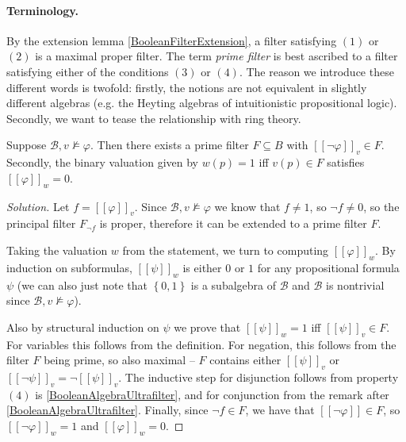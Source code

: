 \paragraph{Terminology.} By the extension lemma \ref{BooleanFilterExtension}, a filter satisfying \( (1) \) or   \( (2) \) is a maximal proper filter. The term \emph{prime filter} is best ascribed to a filter satisfying either of the conditions \( (3) \) or \( (4) \). The reason we introduce these different words is twofold: firstly, the notions are not equivalent in slightly different algebras (e.g. the Heyting algebras of intuitionistic propositional logic). Secondly, we want to tease the relationship with ring theory.

\begin{problem}
    Suppose \( \mathcal{B}, v \not\models \varphi \). Then there exists a prime filter \( F \subseteq B \) with \( \left[ \left[ \neg\varphi \right] \right]_v \in F\). Secondly, the binary valuation given by \( w(p) = 1 \) iff \( v(p) \in F \) satisfies \( \left[ \left[ \varphi \right] \right]_w = 0 \).
\end{problem}

\begin{proof}[Solution]
    Let \( f = \left[ \left[ \varphi \right] \right]_v \). Since \( \mathcal{B}, v \not\models \varphi \) we know that \( f \neq 1 \), so \( \neg f \neq 0 \), so the principal filter \( F_{\neg f} \) is proper, therefore it can be extended to a prime filter \( F \). %

    Taking the valuation \( w \) from the statement, we turn to computing \( \left[ \left[ \varphi \right] \right]_w \). By induction on subformulas, \( \left[ \left[ \psi \right] \right]_w \) is either \( 0 \) or \( 1 \) for any propositional formula \( \psi \) (we can also just note that \( \left\{ 0,1 \right\} \) is a subalgebra of \( \mathcal{B} \) and \( \mathcal{B} \) is nontrivial since \( \mathcal{B}, v \not\models \varphi \)).
    
    Also by structural induction on \( \psi \) we prove that \( \left[ \left[ \psi \right] \right]_w = 1 \) iff \( \left[ \left[ \psi \right] \right]_v \in F \). For variables this follows from the definition. For negation, this follows from the filter \( F \) being prime, so also maximal -- \( F \) contains either \( \left[ \left[ \psi \right] \right]_v \) or \( \left[ \left[ \neg\psi \right] \right]_v = \neg \left[ \left[ \psi \right] \right]_v \). The inductive step for disjunction follows from property \( (4) \) is \ref{BooleanAlgebraUltrafilter}, and for conjunction from the remark after \ref{BooleanAlgebraUltrafilter}.
    Finally, since \( \neg f \in F \), we have that \( \left[ \left[ \neg\varphi \right] \right] \in F \), so \( \left[ \left[ \neg\varphi \right] \right]_w = 1 \) and \( \left[ \left[ \varphi \right] \right]_w = 0 \).
\end{proof}

